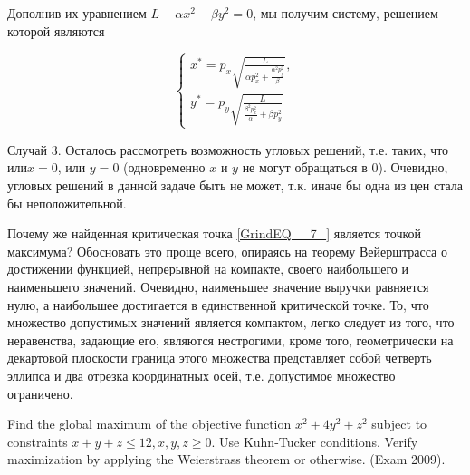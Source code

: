 \begin{solution}
Дополнив их уравнением $L-\alpha x^2-\beta y^2=0$, мы получим систему, решением которой являются 

\begin{equation} \label{GrindEQ__7_} 
\begin{cases}
x^*=p_{x} \sqrt{\frac{L}{\alpha p_{x}^{2} +\frac{\alpha ^{2} p_{y}^{2} }{\beta } } } , \\
y^*=p_{y} \sqrt{\frac{L}{\frac{\beta ^{2} p_{x}^{2} }{\alpha } +\beta p_{y}^{2} } } 
\end{cases}
\end{equation}

Случай 3. Осталось рассмотреть возможность угловых решений, т.е. таких, что или$x=0$, или $y=0$ (одновременно $x$ и $y$ не могут обращаться в 0). Очевидно, угловых решений в данной задаче быть не может, т.к. иначе бы одна из цен стала бы неположительной.

Почему же найденная критическая точка \ref{GrindEQ__7_} является точкой максимума? Обосновать это проще всего, опираясь на теорему Вейерштрасса о достижении функцией, непрерывной на компакте, своего наибольшего и наименьшего значений. Очевидно, наименьшее значение выручки равняется нулю, а наибольшее достигается в единственной критической точке. То, что множество допустимых значений является компактом, легко следует из того, что неравенства, задающие его, являются нестрогими, кроме того, геометрически на декартовой плоскости граница этого множества представляет собой четверть эллипса и два отрезка координатных осей, т.е. допустимое множество ограничено.
\end{solution}


\begin{problem}
Find the global maximum of the objective function $x^{2} +4y^{2} +z^{2} $ subject to constraints $x+y+z\le 12, x,y,z\ge 0$. Use Kuhn-Tucker conditions. Verify maximization by applying the Weierstrass theorem or otherwise. (Exam 2009).
\end{problem}

